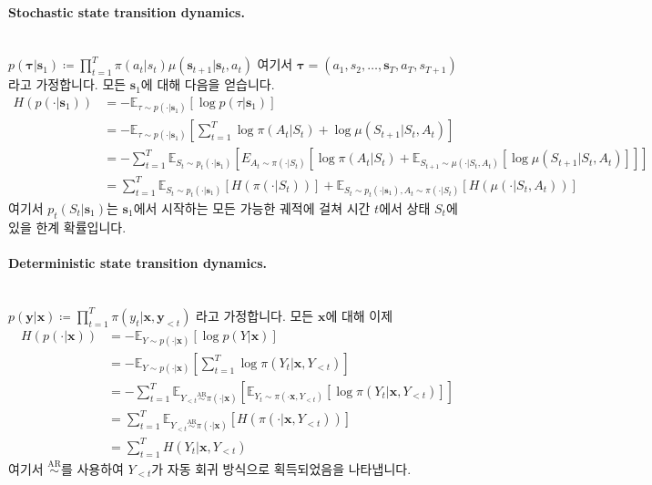 \documentclass{article}
\def\s{{\bm{s}}}
\def\x{{\bm{x}}}
\def\y{{\bm{y}}}
\def\tauv{{\bm{\tau}}}
\def\EE{{\mathbb{E}}}
\def\arsim{\overset{\text{AR}}{\sim}}
\begin{document}
\paragraph{Stochastic state transition dynamics.} \mbox{} \\

$p(\tauv|\s_1) \coloneqq \prod_{t=1}^T \pi(a_t|s_t) \mu(\s_{t+1}|\s_t, a_t)$ 여기서 $\tauv = (a_1, s_2, \dots, \s_T, a_T, s_{T+1})$ 라고 가정합니다. 모든 $\s_1$에 대해 다음을 얻습니다.
 \begin{align} 
H(p( \cdot | \s _1))
&= - \EE _{ \tau \sim p( \cdot | \s _1)} \left [ \log p( \tau | \s _1) \right ] \\
&= - \EE _{ \tau \sim p( \cdot | \s _1)} \left [ \sum _{t=1}^T \log \pi (A_t|S_t) + \log \mu (S_{t+1}|S_t,A_t) \right ] \\
&= - \sum _{t=1}^T \EE _{S_t \sim p_t( \cdot | \s _1)} \left [E_{A_t \sim \pi ( \cdot |S_t)} \left [ \log \pi (A_t|S_t) + \EE _{S_{t+1} \sim \mu ( \cdot |S_t,A_t)} \left [ \log \mu (S_{t+1}|S_t,A_t) \right ] \right ] \right ] \\
&= \sum _{t=1}^T \EE _{S_t \sim p_t( \cdot | \s _1)} \left [H( \pi ( \cdot |S_t)) \right ] + \EE _{S_t \sim p_t( \cdot | \s _1), A_t \sim \pi ( \cdot |S_t)} \left [H( \mu ( \cdot |S_t, A_t)) \right ]
 \end{align} 
여기서 $p_t(S_t|\s_1)$는 $\s_1$에서 시작하는 모든 가능한 궤적에 걸쳐 시간 $t$에서 상태 $S_t$에 있을 한계 확률입니다.

\paragraph{Deterministic state transition dynamics.} \mbox{} \\

$p(\y|\x) \coloneqq \prod_{t=1}^T \pi(y_t|\x,\y_{<t})$ 라고 가정합니다. 모든 $\x$에 대해 이제
 \begin{align} 
H(p( \cdot | \x ))
&= - \EE _{Y \sim p( \cdot | \x )} \left [ \log p(Y| \x ) \right ] \\
&= - \EE _{Y \sim p( \cdot | \x )} \left [ \sum _{t=1}^T \log \pi (Y_t| \x ,Y_{<t}) \right ] \\
&= - \sum _{t=1}^T \EE _{Y_{<t} \arsim \pi ( \cdot | \x )} \left [ \EE _{Y_t \sim \pi ( \cdot \x ,Y_{<t})} \left [ \log \pi (Y_t| \x ,Y_{<t}) \right ] \right ] \\
&= \sum _{t=1}^T \EE _{Y_{<t} \arsim \pi ( \cdot | \x )} \left [H( \pi ( \cdot | \x , Y_{<t})) \right ] \\
&= \sum _{t=1}^T H(Y_t| \x , Y_{<t})
 \end{align} 
여기서 $\arsim$를 사용하여 $Y_{<t}$가 자동 회귀 방식으로 획득되었음을 나타냅니다.
\end{document}
